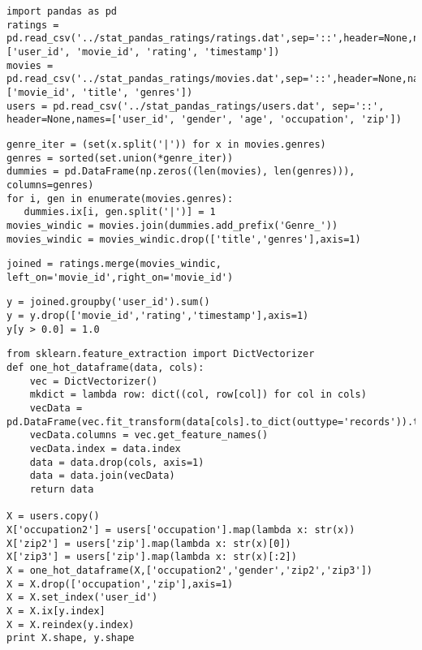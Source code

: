 \documentclass[12pt,fleqn]{article}\usepackage{../common}
\begin{document}
\begin{verbatim}
import pandas as pd
ratings =  pd.read_csv('../stat_pandas_ratings/ratings.dat',sep='::',header=None,names=['user_id', 'movie_id', 'rating', 'timestamp'])
movies =  pd.read_csv('../stat_pandas_ratings/movies.dat',sep='::',header=None,names=['movie_id', 'title', 'genres'])
users = pd.read_csv('../stat_pandas_ratings/users.dat', sep='::', header=None,names=['user_id', 'gender', 'age', 'occupation', 'zip'])
\end{verbatim}

\begin{verbatim}
genre_iter = (set(x.split('|')) for x in movies.genres)
genres = sorted(set.union(*genre_iter))
dummies = pd.DataFrame(np.zeros((len(movies), len(genres))), columns=genres)
for i, gen in enumerate(movies.genres):
   dummies.ix[i, gen.split('|')] = 1
movies_windic = movies.join(dummies.add_prefix('Genre_'))
movies_windic = movies_windic.drop(['title','genres'],axis=1)
\end{verbatim}

\begin{verbatim}
joined = ratings.merge(movies_windic, left_on='movie_id',right_on='movie_id')
\end{verbatim}

\begin{verbatim}
y = joined.groupby('user_id').sum()
y = y.drop(['movie_id','rating','timestamp'],axis=1)
y[y > 0.0] = 1.0
\end{verbatim}

\begin{verbatim}
from sklearn.feature_extraction import DictVectorizer
def one_hot_dataframe(data, cols):
    vec = DictVectorizer()
    mkdict = lambda row: dict((col, row[col]) for col in cols)
    vecData = pd.DataFrame(vec.fit_transform(data[cols].to_dict(outtype='records')).toarray())
    vecData.columns = vec.get_feature_names()
    vecData.index = data.index
    data = data.drop(cols, axis=1)
    data = data.join(vecData)
    return data

X = users.copy()
X['occupation2'] = users['occupation'].map(lambda x: str(x))
X['zip2'] = users['zip'].map(lambda x: str(x)[0])
X['zip3'] = users['zip'].map(lambda x: str(x)[:2])
X = one_hot_dataframe(X,['occupation2','gender','zip2','zip3'])
X = X.drop(['occupation','zip'],axis=1)
X = X.set_index('user_id')
X = X.ix[y.index]
X = X.reindex(y.index)
print X.shape, y.shape
\end{verbatim}
\end{document}
